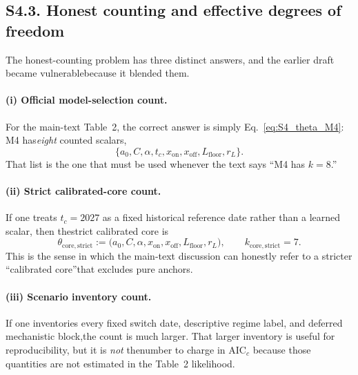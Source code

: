 \documentclass[11pt]{article}
\begin{document}
\subsection*{S4.3. Honest counting and effective degrees of freedom}\label{subsec:S4_honest_counting}
The honest-counting problem has three distinct answers, and the earlier draft became vulnerablebecause it blended them.
\paragraph{(i) Official model-selection count.}
For the main-text Table~2, the correct answer is simply Eq.~\eqref{eq:S4_theta_M4}: M4 has\emph{eight} counted scalars,
\[\{a_0,C,\alpha,t_c,x_{\mathrm{on}},x_{\mathrm{off}},L_{\mathrm{floor}},r_L\}.\]
That list is the one that must be used whenever the text says ``M4 has $k=8$.''
\paragraph{(ii) Strict calibrated-core count.}
If one treats $t_c=2027$ as a fixed historical reference date rather than a learned scalar, then thestrict calibrated core is
\begin{equation}\theta_{\mathrm{core,strict}}:=\bigl(a_0,C,\alpha,x_{\mathrm{on}},x_{\mathrm{off}},L_{\mathrm{floor}},r_L\bigr),\qquad k_{\mathrm{core,strict}}=7.\tag{S4.2}\label{eq:S4_theta_core_strict}\end{equation}
This is the sense in which the main-text discussion can honestly refer to a stricter ``calibrated core''that excludes pure anchors.
\paragraph{(iii) Scenario inventory count.}
If one inventories every fixed switch date, descriptive regime label, and deferred mechanistic block,the count is much larger. That larger inventory is useful for reproducibility, but it is \emph{not} thenumber to charge in AIC$_c$ because those quantities are not estimated in the Table~2 likelihood.
\end{document}
